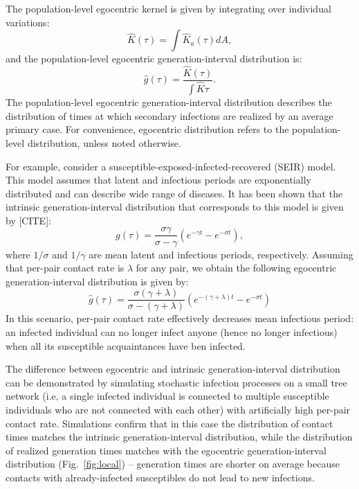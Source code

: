 \documentclass[12pt]{article}
\newcommand{\fref}[1]{Fig.~\ref{fig:#1}}
\begin{document}
The population-level egocentric kernel is given by integrating over individual variations:
\begin{equation}
\hat{K}(\tau) = \int \hat{K}_a(\tau) dA,
\end{equation}
and the population-level egocentric generation-interval distribution is:
\begin{equation}
\hat{g}(\tau) = \frac{\hat{K}(\tau)}{\int \hat{K} \tau}.
\label{eq:conditional}
\end{equation}
The population-level egocentric generation-interval distribution describes the distribution of times at which secondary infections are realized by an average primary case.
For convenience, egocentric distribution refers to the population-level distribution, unless noted otherwise.

For example, consider a susceptible-exposed-infected-recovered (SEIR) model.
This model assumes that latent and infectious periods are exponentially distributed and can describe wide range of diseases.
It has been shown that the intrinsic generation-interval distribution that corresponds to this model is given by [CITE]:
\begin{equation}
g(\tau) = \frac{\sigma \gamma}{\sigma - \gamma} \left(e^{-\gamma t} - e^{-\sigma t}\right),
\end{equation}
where $1/\sigma$ and $1/\gamma$ are mean latent and infectious periods, respectively.
Assuming that per-pair contact rate is $\lambda$ for any pair, we obtain the following egocentric generation-interval distribution is given by:
\begin{equation}
\hat{g}(\tau) = \frac{\sigma (\gamma + \lambda)}{\sigma - (\gamma + \lambda)} \left(e^{-(\gamma + \lambda)t} - e^{-\sigma t}\right)
\end{equation}
In this scenario, per-pair contact rate effectively decreases mean infectious period: an infected individual can no longer infect anyone (hence no longer infectious) when all its susceptible acquaintances have ben infected.

The difference between egocentric and intrinsic generation-interval distribution can be demonstrated by simulating stochastic infection processes on a small tree network (i.e, a single infected individual is connected to multiple susceptible individuals who are not connected with each other) with artificially high per-pair contact rate.
Simulations confirm that in this case the distribution of contact times matches the intrinsic generation-interval distribution, while the distribution of realized generation times matches with the egocentric generation-interval distribution (\fref{local}) -- generation times are shorter on average because contacts with already-infected susceptibles do not lead to new infections.
\end{document}
